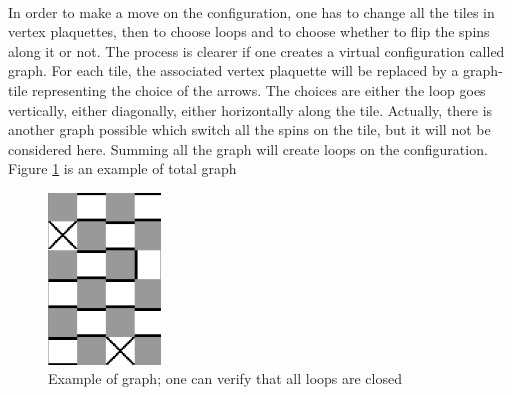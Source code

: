 \documentclass[a4paper,12pt,twoside]{article}
\begin{document}
	\paragraph{}
	In order to make a move on the configuration, one has to change all the tiles in vertex plaquettes, then to choose loops and to choose whether to flip the spins along it or not. The process is clearer if one creates a virtual configuration called graph. For each tile, the associated vertex plaquette will be replaced by a graph-tile representing the choice of the arrows. The choices are either the loop goes vertically, either diagonally, either horizontally along the tile. Actually, there is another graph possible which switch all the spins on the tile, but it will not be considered here. Summing all the graph will create loops on the configuration. Figure \ref{graph_example} is an example of total graph
	\begin{figure}[!h]
		 \centering
		 \includegraphics[width = 3cm]{random_graph.png}
		 \caption{Example of graph; one can verify that all loops are closed}
		 \label{graph_example}
	\end{figure}
\end{document}
